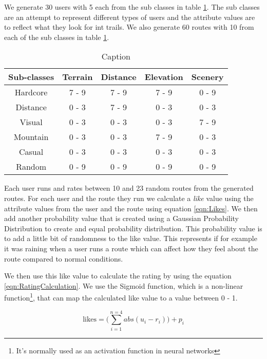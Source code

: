 We generate 30 users with 5 each from the sub classes in table \ref{tab:attributeSubClasses}. The sub classes are an attempt to represent different types of users and the attribute values are to reflect what they look for int trails. We also generate 60 routes with 10 from each of the sub classes in table \ref{tab:attributeSubClasses}.
\begin{table}[ht]
    \centering
    \begin{tabular}{|c|c|c|c|c|}
        \hline
         Sub-classes & Terrain & Distance & Elevation & Scenery \\
         \hline
         Hardcore & 7 - 9 & 7 - 9 & 7 - 9 & 0 - 9 \\  
         \hline
         Distance & 0 - 3 & 7 - 9 & 0 - 3 & 0 - 3 \\
         \hline
         Visual & 0 - 3 & 0 - 3 & 0 - 3 & 7 - 9 \\
         \hline
         Mountain & 0 - 3 & 0 - 3 & 7 - 9 & 0 - 3 \\
         \hline
         Casual & 0 - 3 & 0 - 3 & 0 - 3 & 0 - 3 \\
         \hline
         Random & 0 - 9 & 0 - 9 & 0 - 9 & 0 - 9 \\
         \hline
    \end{tabular}
    \caption{Caption}
    \label{tab:attributeSubClasses}
\end{table}

Each user runs and rates between 10 and 23 random routes from the generated routes. For each user and the route they run we calculate a \textit{like} value using the attribute values from the user and the route using equation \ref{eqn:Likes}. We then add another probability value that is created using a Gaussian Probability Distribution\cite{simon2007probability} to create and equal probability distribution. This probability value is to add a little bit of randomness to the like value. This represents if for example it was raining when a user runs a route which can affect how they feel about the route compared to normal conditions.

We then use this like value to calculate the rating by using the equation \ref{eqn:RatingCalculation}. We use the Sigmoid function\cite{wiki:SigmoidFunction}, which is a non-linear function\footnote{It's normally used as an activation function in neural networks}, that can map the calculated like value to a value between 0 - 1.

\begin{equation} \label{eqn:Likes}
    \textrm{likes} = \Bigg(\sum_{i=1}^{n=4}abs({u_i}-{r_i})\Bigg) + {p_i}
\end{equation}

